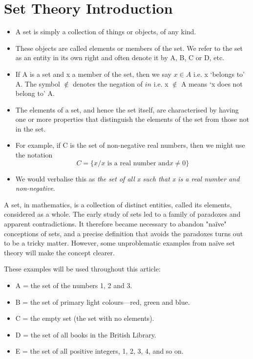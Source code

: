 \documentclass[11pt,a4paper,titlepage,oneside,openany]{article}
\numberwithin{equation}{section}
\numberwithin{algorithm}{section}
\numberwithin{figure}{section}
\numberwithin{table}{section}
\begin{document}
\section{Set Theory Introduction}


\begin{itemize}
\item A set is simply a collection of things or objects, of any kind. 
\item These objects
are called elements or members of the set. We refer to the set as an
entity in its own right and often denote it by A, B, C or D, etc.
\item 
If A is a set and x a member of the set, then we say $x \in A$ i.e. x ‘belongs to’
A. The symbol $\notin$ denotes the negation of $in$  i.e. x $\notin$ A means ‘x does not
belong to’ A.
\end{itemize}

\begin{itemize}
\item The elements of a set, and hence the set itself, are characterised by having
one or more properties that distinguish the elements of the set from those
not in the set. 
\item For example, if C is the set of non-negative real numbers, then we
might use the notation
\[C = \{x / x \mbox{ is a real number and} x \neq 0\}\]
\item We would verbalise this as \textit{the set of all x such that x is a real number and non-negative}.
\end{itemize}

	A set, in mathematics, is a collection of distinct entities, called its elements, considered as a whole. The early study of sets led to a family of paradoxes and apparent contradictions. It therefore became necessary to abandon "naïve" conceptions of sets, and a precise definition that avoids the paradoxes turns out to be a tricky matter. However, some unproblematic examples from naïve set theory will make the concept clearer. 

	These examples will be used throughout this article:
	
	\begin{itemize}
		\item A = the set of the numbers 1, 2 and 3.
		\item B = the set of primary light colours—red, green and blue.
		\item C = the empty set (the set with no elements).
		\item D = the set of all books in the British Library.
		\item E = the set of all positive integers, 1, 2, 3, 4, and so on.
	\end{itemize}
	
\end{document}
